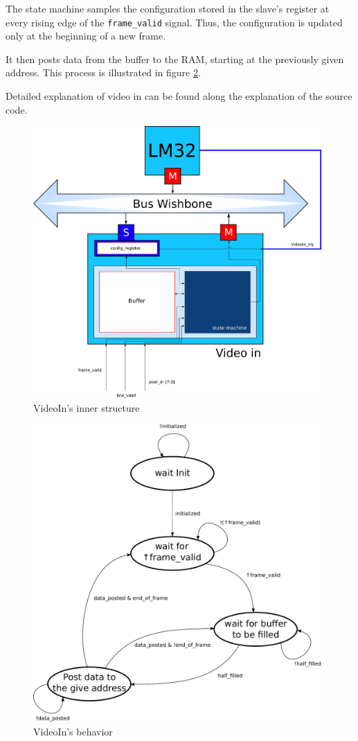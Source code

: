 The state machine samples the configuration stored in the slave's register at every rising edge of the \texttt{frame\_valid} signal. Thus, the configuration is updated only at the beginning of a new frame.

It then posts data from the buffer to the RAM, starting at the previously given address. This process is illustrated in figure \ref{VideoIn_sm}. 

Detailed explanation of video in can be found along the explanation of the source code.

\begin{figure}[h]
\center
\includegraphics[width=11cm]{figs/Video_In_blocks.pdf}
\caption{VideoIn's inner structure}
\label{VideoIn_struct}
\end{figure}


\begin{figure}[h]
\center
\includegraphics[width=11cm]{figs/video_in_sm.pdf}
\caption{VideoIn's behavior}
\label{VideoIn_sm}
\end{figure}

